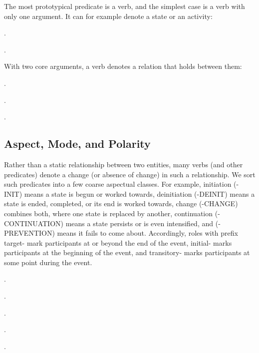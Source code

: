 \documentclass[a4paper]{article}
\newcommand{\frs}[1]{\mbox{\textsf{#1}}} %
\newcommand{\rl}[1]{\textsf{#1}}
\begin{document}
The most prototypical predicate is a verb, and the simplest case is a verb with only one argument. It can for example denote a state or an activity:

\ex.

\ex.

With two core arguments, a verb denotes a relation that holds between them:

\ex.

\ex.

\ex.

\newpage\subsection{Aspect, Mode, and Polarity}
\label{sec:aspect-mode-polarity}

Rather than a static relationship between two entities, many verbs (and other
predicates) denote a change (or absence of change) in such a relationship. We
sort such predicates into a few coarse aspectual classes. For example,
initiation (\frs{-INIT}) means a state is begun or worked towards, deinitiation
(\frs{-DEINIT}) means a state is ended, completed, or its end is worked
towards, change (\frs{-CHANGE}) combines both, where one state is replaced by
another, continuation (\frs{-CONTINUATION}) means a state persists or is even
intensified, and (\frs{-PREVENTION}) means it fails to come about.
Accordingly, roles with prefix \rl{target-} mark participants at or beyond the
end of the event, \rl{initial-} marks participants at the beginning of the
event, and \rl{transitory-} marks participants at some point during the event.

\ex.

\ex.

\ex.

\ex.

\ex.
\end{document}
